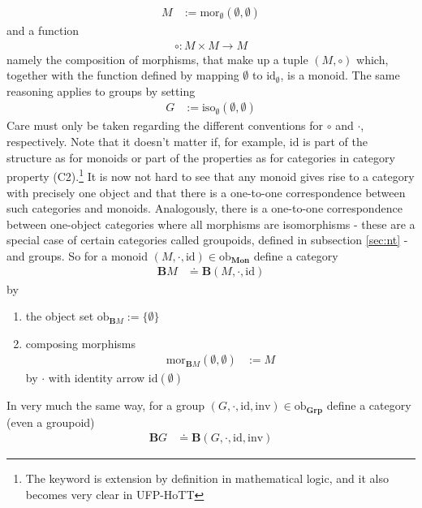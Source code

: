 \begin{exa}
\begin{align*}
  M
  &:=
  \mathrm{mor}_{\pmb{\emptyset}}(\emptyset,\emptyset)
\end{align*}
and a function
\begin{align*}
  \circ
  \colon
  M
  \times
  M
  \rightarrow
  M
\end{align*}
namely the composition of morphisms, that make up a tuple $(M,\circ)$ which, together with the function defined by mapping $\emptyset$ to $\mathrm{id}_{\emptyset}$, is a monoid.
The same reasoning applies to groups by setting
\begin{align*}
  G
  &:=
  \mathrm{iso}_{\pmb{\emptyset}}(\emptyset,\emptyset)
\end{align*}
Care must only be taken regarding the different conventions for $\circ$ and $\cdot$, respectively.
Note that it doesn't matter if, for example, $\mathrm{id}$ is part of the structure as for monoids or part of the properties as for categories in category property (C2).\footnote{The keyword is extension by definition in mathematical logic, and it also becomes very clear in UFP-HoTT} It is now not hard to see that any monoid gives rise to a category with precisely one object and that there is a one-to-one correspondence between such categories and monoids.
Analogously, there is a one-to-one correspondence between one-object categories where all morphisms are isomorphisms - these are a special case of certain categories called groupoids, defined in subsection \ref{sec:nt} - and groups.
So for a monoid $(M,\cdot,\mathrm{id}) \in \mathrm{ob}_{\mathbf{Mon}}$ define a category
\begin{align*}
  \mathbf{B}M
  &\doteq
  \mathbf{B}(M,\cdot,\mathrm{id})
\end{align*}
by
\begin{enumerate}
\item[$\bullet$]
the object set $\mathrm{ob}_{\mathbf{B}M} := \lbrace \emptyset \rbrace$
\item[$\bullet$]
composing morphisms
\begin{align*}
  \mathrm{mor}_{\mathbf{B}M}(\emptyset,\emptyset)
  &:=
  M
\end{align*}
by $\cdot$ with identity arrow $\mathrm{id}(\emptyset)$
\end{enumerate}
In very much the same way, for a group $(G,\cdot,\mathrm{id},\mathrm{inv}) \in \mathrm{ob}_{\mathbf{Grp}}$ define a category (even a groupoid)
\begin{align*}
  \mathbf{B}G
  &\doteq
  \mathbf{B}(G,\cdot,\mathrm{id},\mathrm{inv})
\end{align*}

\end{exa}
